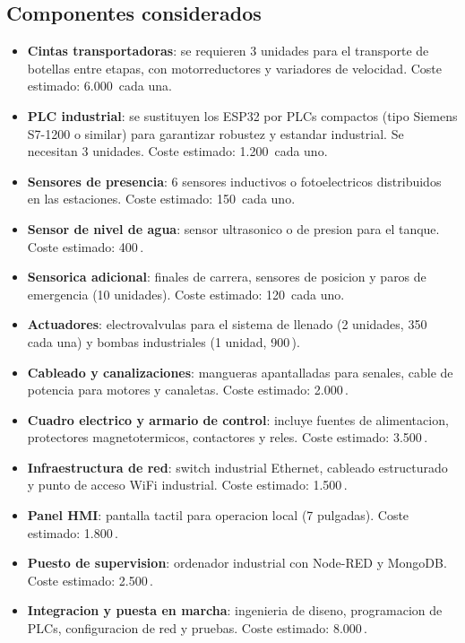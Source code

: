 \subsection{Componentes considerados}

\begin{itemize}
    \item \textbf{Cintas transportadoras}: se requieren 3 unidades para el transporte de botellas entre etapas, con motorreductores y variadores de velocidad. Coste estimado: 6.000\,\texteuro{} cada una.
    \item \textbf{PLC industrial}: se sustituyen los ESP32 por PLCs compactos (tipo Siemens S7-1200 o similar) para garantizar robustez y estandar industrial. Se necesitan 3 unidades. Coste estimado: 1.200\,\texteuro{} cada uno.
    \item \textbf{Sensores de presencia}: 6 sensores inductivos o fotoelectricos distribuidos en las estaciones. Coste estimado: 150\,\texteuro{} cada uno.
    \item \textbf{Sensor de nivel de agua}: sensor ultrasonico o de presion para el tanque. Coste estimado: 400\,\texteuro{}.
    \item \textbf{Sensorica adicional}: finales de carrera, sensores de posicion y paros de emergencia (10 unidades). Coste estimado: 120\,\texteuro{} cada uno.
    \item \textbf{Actuadores}: electrovalvulas para el sistema de llenado (2 unidades, 350\,\texteuro{} cada una) y bombas industriales (1 unidad, 900\,\texteuro{}).
    \item \textbf{Cableado y canalizaciones}: mangueras apantalladas para senales, cable de potencia para motores y canaletas. Coste estimado: 2.000\,\texteuro{}.
    \item \textbf{Cuadro electrico y armario de control}: incluye fuentes de alimentacion, protectores magnetotermicos, contactores y reles. Coste estimado: 3.500\,\texteuro{}.
    \item \textbf{Infraestructura de red}: switch industrial Ethernet, cableado estructurado y punto de acceso WiFi industrial. Coste estimado: 1.500\,\texteuro{}.
    \item \textbf{Panel HMI}: pantalla tactil para operacion local (7 pulgadas). Coste estimado: 1.800\,\texteuro{}.
    \item \textbf{Puesto de supervision}: ordenador industrial con Node-RED y MongoDB. Coste estimado: 2.500\,\texteuro{}.
    \item \textbf{Integracion y puesta en marcha}: ingenieria de diseno, programacion de PLCs, configuracion de red y pruebas. Coste estimado: 8.000\,\texteuro{}.
\end{itemize}

